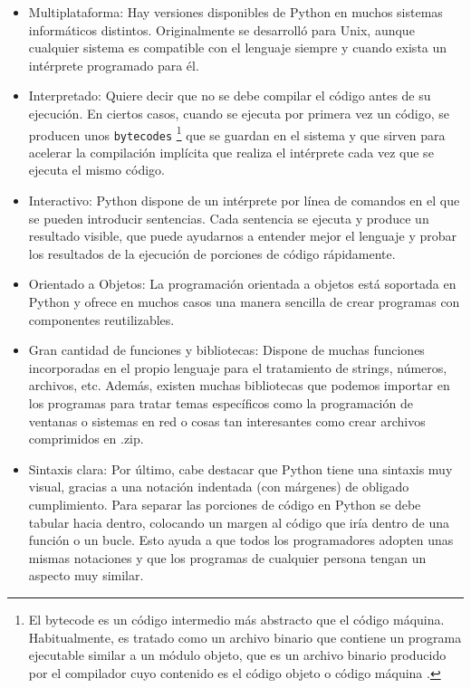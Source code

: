 \documentclass[a4paper, 12pt]{book}
\begin{document}
\begin{itemize}
\item Multiplataforma: Hay versiones disponibles de Python en muchos sistemas informáticos distintos. Originalmente se desarrolló para Unix, aunque cualquier sistema es compatible con el lenguaje siempre y cuando exista un intérprete programado para él.

\item Interpretado: Quiere decir que no se debe compilar el código antes de su ejecución. En ciertos casos, cuando se ejecuta por primera vez un código, se producen unos \texttt{bytecodes} 
\footnote{El bytecode es un código intermedio más abstracto que el código máquina. Habitualmente, es tratado como un archivo binario que contiene un programa ejecutable similar a un módulo objeto, que es un archivo binario producido por el compilador cuyo contenido es el código objeto o código máquina .} que se guardan en el sistema y que sirven para acelerar la compilación implícita que realiza el intérprete cada vez que se ejecuta el mismo código.

\item Interactivo: Python dispone de un intérprete por línea de comandos en el que se pueden introducir sentencias. Cada sentencia se ejecuta y produce un resultado visible, que puede ayudarnos a entender mejor el lenguaje y probar los resultados de la ejecución de porciones de código rápidamente.

\item Orientado a Objetos: La programación orientada a objetos está soportada en Python y ofrece en muchos casos una manera sencilla de crear programas con componentes reutilizables.

\item Gran cantidad de funciones y bibliotecas: Dispone de muchas funciones incorporadas en el propio lenguaje para el tratamiento de strings, números, archivos, etc. Además, existen muchas bibliotecas que podemos importar en los programas para tratar temas específicos como la programación de ventanas o sistemas en red o cosas tan interesantes como crear archivos comprimidos en .zip.

\item Sintaxis clara: Por último, cabe destacar que Python tiene una sintaxis muy visual, gracias a una notación indentada (con márgenes) de obligado cumplimiento. Para separar las porciones de código en Python se debe tabular hacia dentro, colocando un margen al código que iría dentro de una función o un bucle. Esto ayuda a que todos los programadores adopten unas mismas notaciones y que los programas de cualquier persona tengan un aspecto muy similar.
\end{itemize}
\end{document}
